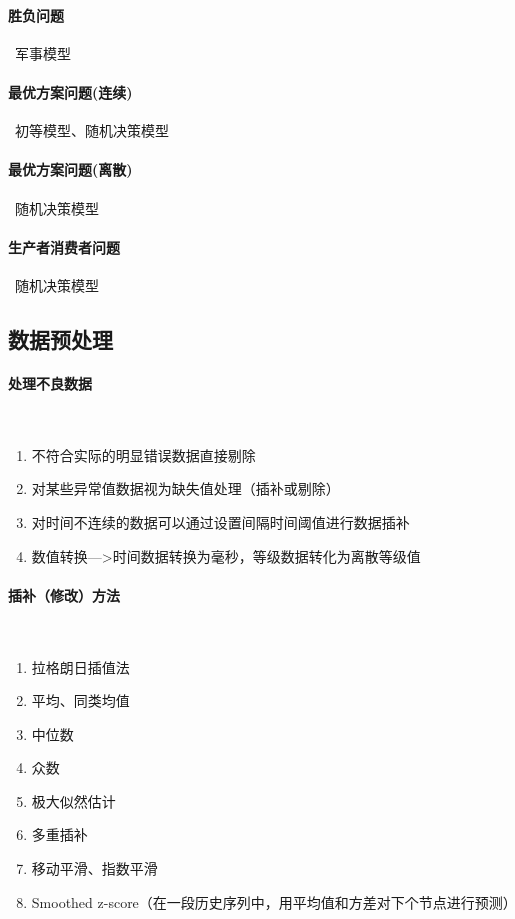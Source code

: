   \paragraph{胜负问题}~{军事模型}
  \paragraph{最优方案问题(连续)}~{初等模型、随机决策模型}
  \paragraph{最优方案问题(离散)}~{随机决策模型}
  \paragraph{生产者消费者问题}~{随机决策模型}

\subsection{数据预处理}

  \paragraph{处理不良数据}~{}

  \begin{enumerate}
    \item 不符合实际的明显错误数据直接剔除
    \item 对某些异常值数据视为缺失值处理（插补或剔除）
    \item 对时间不连续的数据可以通过设置间隔时间阈值进行数据插补
    \item 数值转换—>时间数据转换为毫秒，等级数据转化为离散等级值
  \end{enumerate}

  \paragraph{插补（修改）方法}~{}

  \begin{enumerate}
    \item 拉格朗日插值法
    \item 平均、同类均值
    \item 中位数
    \item 众数
    \item 极大似然估计
    \item 多重插补
    \item 移动平滑、指数平滑
    \item Smoothed z-score（在一段历史序列中，用平均值和方差对下个节点进行预测）
  \end{enumerate}

